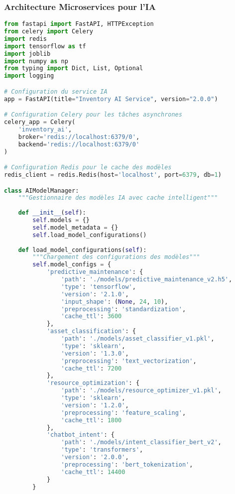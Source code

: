 \documentclass[12pt,a4paper]{report}
\begin{document}
\subsubsection{Architecture Microservices pour l'IA}

\begin{lstlisting}[language=Python, caption=Service de modèles IA distribués]
from fastapi import FastAPI, HTTPException
from celery import Celery
import redis
import tensorflow as tf
import joblib
import numpy as np
from typing import Dict, List, Optional
import logging

# Configuration du service IA
app = FastAPI(title="Inventory AI Service", version="2.0.0")

# Configuration Celery pour les tâches asynchrones
celery_app = Celery(
    'inventory_ai',
    broker='redis://localhost:6379/0',
    backend='redis://localhost:6379/0'
)

# Configuration Redis pour le cache des modèles
redis_client = redis.Redis(host='localhost', port=6379, db=1)

class AIModelManager:
    """Gestionnaire des modèles IA avec cache intelligent"""
    
    def __init__(self):
        self.models = {}
        self.model_metadata = {}
        self.load_model_configurations()
    
    def load_model_configurations(self):
        """Chargement des configurations des modèles"""
        self.model_configs = {
            'predictive_maintenance': {
                'path': './models/predictive_maintenance_v2.h5',
                'type': 'tensorflow',
                'version': '2.1.0',
                'input_shape': (None, 24, 10),
                'preprocessing': 'standardization',
                'cache_ttl': 3600
            },
            'asset_classification': {
                'path': './models/asset_classifier_v1.pkl',
                'type': 'sklearn',
                'version': '1.3.0',
                'preprocessing': 'text_vectorization',
                'cache_ttl': 7200
            },
            'resource_optimization': {
                'path': './models/resource_optimizer_v1.pkl',
                'type': 'sklearn',
                'version': '1.2.0',
                'preprocessing': 'feature_scaling',
                'cache_ttl': 1800
            },
            'chatbot_intent': {
                'path': './models/intent_classifier_bert_v2',
                'type': 'transformers',
                'version': '2.0.0',
                'preprocessing': 'bert_tokenization',
                'cache_ttl': 14400
            }
        }
    

\end{lstlisting}
\end{document}
